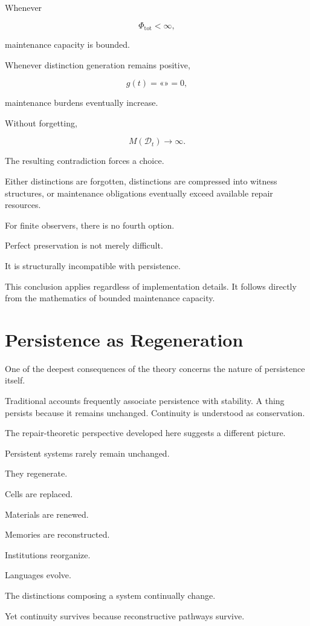 \documentclass[12pt,oneside]{book}
\theoremstyle{plain} \newtheorem{theorem}{Theorem}[chapter] \newtheorem{lemma}[theorem]{Lemma} \newtheorem{proposition}[theorem]{Proposition} \newtheorem{corollary}[theorem]{Corollary}
\theoremstyle{definition} \newtheorem{definition}[theorem]{Definition} \newtheorem{axiom}[theorem]{Axiom} \newtheorem{construction}[theorem]{Construction}
\theoremstyle{remark} \newtheorem{remark}[theorem]{Remark} \newtheorem{example}[theorem]{Example}
\newcommand{\D}{\mathcal{D}} \newcommand{\R}{\mathcal{R}} \newcommand{\F}{\mathcal{F}} \newcommand{\U}{\mathcal{U}} \newcommand{\M}{\mathcal{M}} \newcommand{\G}{\Gamma}
\begin{document}
Whenever

\[
\Phi_{\mathrm{tot}}
<
\infty,
\]

maintenance capacity is bounded.

Whenever distinction generation remains positive,

\[
g(t)
=
«»
=
0,
\]

maintenance burdens eventually increase.

Without forgetting,

\[
M(\D_t)
\rightarrow
\infty.
\]

The resulting contradiction forces a choice.

Either distinctions are forgotten, distinctions are compressed into witness structures, or maintenance obligations eventually exceed available repair resources.

For finite observers, there is no fourth option.

Perfect preservation is not merely difficult.

It is structurally incompatible with persistence.

This conclusion applies regardless of implementation details. It follows directly from the mathematics of bounded maintenance capacity.

\section{Persistence as Regeneration}

One of the deepest consequences of the theory concerns the nature of persistence itself.

Traditional accounts frequently associate persistence with stability. A thing persists because it remains unchanged. Continuity is understood as conservation.

The repair-theoretic perspective developed here suggests a different picture.

Persistent systems rarely remain unchanged.

They regenerate.

Cells are replaced.

Materials are renewed.

Memories are reconstructed.

Institutions reorganize.

Languages evolve.

The distinctions composing a system continually change.

Yet continuity survives because reconstructive pathways survive.
\end{document}
